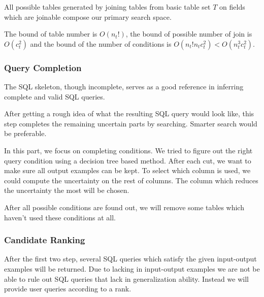 All possible tables generated by joining tables from basic table set $T$ on fields which are joinable compose our primary search space.


The bound of table number is $O(n_t!)$, the bound of possible number of join is $O(c_t^2)$ and the bound of the number of conditions is $O(n_t!n_tc_t^2)<O(n_t^3c_t^2)$.


\subsubsection{Query Completion}
\label{sec:completion}

The SQL skeleton, though incomplete, serves as a good reference in
inferring complete and valid SQL queries.

After getting a rough idea of what the resulting SQL query would
look like, this step completes the remaining uncertain parts by
searching. Smarter search would be preferable.

In this part, we focus on completing conditions. We tried to figure out the right query condition using a decision tree based method. After each cut, we want to make sure all output examples can be kept. To select which column is used, we could compute the uncertainty on the rest of columns. The column which reduces the uncertainty the most will be chosen.

After all possible conditions are found out, we will remove some tables which haven't used these conditions at all.


\subsubsection{Candidate Ranking}
\label{sec:ranking}

After the first two step, several SQL queries which satisfy the given input-output examples will be returned. Due to lacking in input-output examples we are not be able to rule out SQL queries that lack in generalization ability. Instead we will provide user queries according to a rank.

